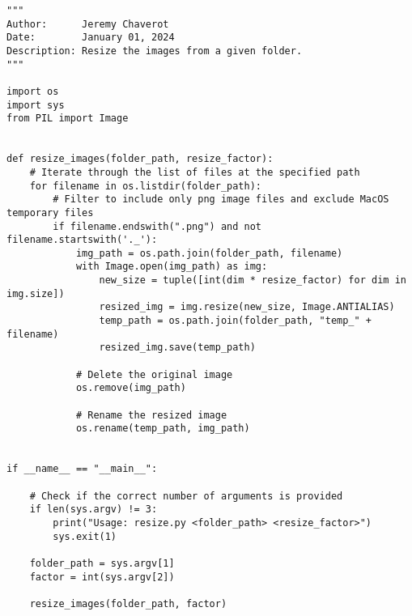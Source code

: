 \begin{lstlisting}[style=pythonstyle, label=lst:6, caption=Python script \texttt{resize.py} designed to alter an image's size with respect to a specified resize factor.]
"""
Author:      Jeremy Chaverot
Date:        January 01, 2024
Description: Resize the images from a given folder.
"""

import os
import sys
from PIL import Image


def resize_images(folder_path, resize_factor):
	# Iterate through the list of files at the specified path
    for filename in os.listdir(folder_path):
    	# Filter to include only png image files and exclude MacOS temporary files
        if filename.endswith(".png") and not filename.startswith('._'):
            img_path = os.path.join(folder_path, filename)
            with Image.open(img_path) as img:
                new_size = tuple([int(dim * resize_factor) for dim in img.size])
                resized_img = img.resize(new_size, Image.ANTIALIAS)
                temp_path = os.path.join(folder_path, "temp_" + filename)
                resized_img.save(temp_path)

            # Delete the original image
            os.remove(img_path)

            # Rename the resized image
            os.rename(temp_path, img_path)


if __name__ == "__main__":

	# Check if the correct number of arguments is provided
    if len(sys.argv) != 3:
        print("Usage: resize.py <folder_path> <resize_factor>")
        sys.exit(1)

    folder_path = sys.argv[1]
    factor = int(sys.argv[2])

    resize_images(folder_path, factor)
\end{lstlisting}




\cleardoublepage{}
